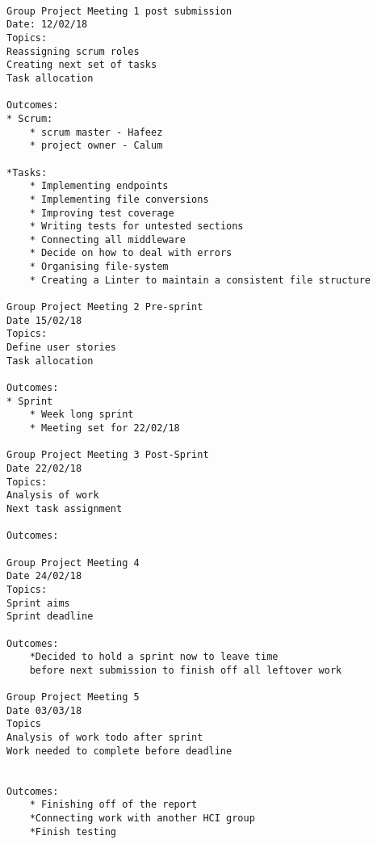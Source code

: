 \begin{lstlisting} 

Group Project Meeting 1 post submission
Date: 12/02/18 
Topics: 
Reassigning scrum roles 
Creating next set of tasks 
Task allocation 

Outcomes:
* Scrum: 
    * scrum master - Hafeez 
    * project owner - Calum 

*Tasks:
    * Implementing endpoints
    * Implementing file conversions 
    * Improving test coverage 
    * Writing tests for untested sections 
    * Connecting all middleware 
    * Decide on how to deal with errors
    * Organising file-system 
    * Creating a Linter to maintain a consistent file structure 
    
Group Project Meeting 2 Pre-sprint
Date 15/02/18
Topics:
Define user stories
Task allocation 

Outcomes:
* Sprint
    * Week long sprint 
    * Meeting set for 22/02/18
    
Group Project Meeting 3 Post-Sprint
Date 22/02/18
Topics:
Analysis of work 
Next task assignment

Outcomes:

Group Project Meeting 4
Date 24/02/18
Topics: 
Sprint aims
Sprint deadline

Outcomes:
    *Decided to hold a sprint now to leave time 
    before next submission to finish off all leftover work

Group Project Meeting 5
Date 03/03/18 
Topics 
Analysis of work todo after sprint
Work needed to complete before deadline


Outcomes: 
    * Finishing off of the report 
    *Connecting work with another HCI group 
    *Finish testing 




    
    
    
\end{lstlisting}
